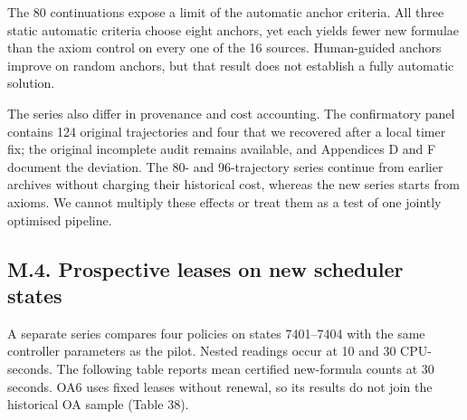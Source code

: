 \documentclass[pdflatex,sn-basic,Numbered]{sn-jnl}
\begin{document}
\endgroup

The 80 continuations expose a limit of the automatic anchor criteria. All three static automatic criteria choose eight anchors, yet each yields fewer new formulae than the axiom control on every one of the 16 sources. Human-guided anchors improve on random anchors, but that result does not establish a fully automatic solution.

The series also differ in provenance and cost accounting. The confirmatory panel contains 124 original trajectories and four that we recovered after a local timer fix; the original incomplete audit remains available, and Appendices D and F document the deviation. The 80- and 96-trajectory series continue from earlier archives without charging their historical cost, whereas the new series starts from axioms. We cannot multiply these effects or treat them as a test of one jointly optimised pipeline.

\subsection*{M.4. Prospective leases on new scheduler states}\label{m.4.-prospective-leases-on-new-scheduler-states}

A separate series compares four policies on states 7401--7404 with the same controller parameters as the pilot. Nested readings occur at 10 and 30 CPU-seconds. The following table reports mean certified new-formula counts at 30 seconds. OA6 uses fixed leases without renewal, so its results do not join the historical OA sample (Table 38).

\begingroup
\small
\setlength{\tabcolsep}{3pt}
\renewcommand{\arraystretch}{1.13}
\end{document}
